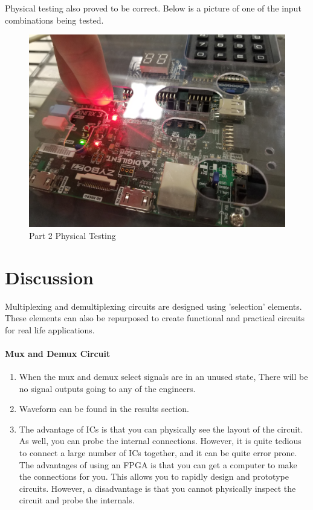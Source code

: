 \documentclass{article}
\begin{document}
    Physical testing also proved to be correct.
    Below is a picture of one of the input combinations being tested.

    \begin{figure}[H]
        \includegraphics[width=\linewidth]{access_testing.jpg}
        \caption{Part 2 Physical Testing}
        \label{fig:part2_testing}
    \end{figure}


    \section{Discussion}
    Multiplexing and demultiplexing circuits are designed using 'selection' elements.
    These elements can also be repurposed to create functional
    and practical circuits for real life applications.
    
    \paragraph{Mux and Demux Circuit}

    \begin{enumerate}
            \item When the mux and demux select signals are in an unused state,
                There will be no signal outputs going to any of the engineers.
                
            \item Waveform can be found in the results section.

            \item The advantage of ICs is that you can physically see the layout of the circuit. As well, you can probe the internal connections.
                However, it is quite tedious to connect a large number of ICs together,
                and it can be quite error prone.
                The advantages of using an FPGA is that you can get a computer to make the connections for you.
                This allows you to rapidly design and prototype circuits. However, a disadvantage is that
                you cannot physically inspect the circuit and probe the internals.
    \end{enumerate}
\end{document}
